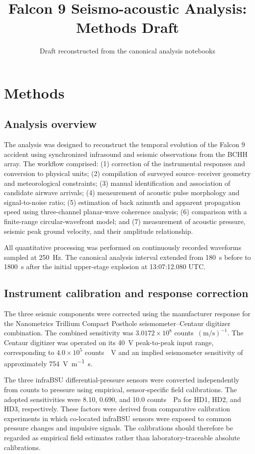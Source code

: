 \documentclass[12pt]{article}
\title{Falcon 9 Seismo-acoustic Analysis: Methods Draft}
\author{}
\date{Draft reconstructed from the canonical analysis notebooks}
\begin{document}
\maketitle

\section{Methods}

\subsection{Analysis overview}

The analysis was designed to reconstruct the temporal evolution of the Falcon 9
accident using synchronized infrasound and seismic observations from the BCHH
array. The workflow comprised: (1) correction of the instrumental responses and
conversion to physical units; (2) compilation of surveyed source--receiver
geometry and meteorological constraints; (3) manual identification and
association of candidate airwave arrivals; (4) measurement of acoustic pulse
morphology and signal-to-noise ratio; (5) estimation of back azimuth and apparent
propagation speed using three-channel planar-wave coherence analysis; (6)
comparison with a finite-range circular-wavefront model; and (7) measurement of
acoustic pressure, seismic peak ground velocity, and their amplitude
relationship.

All quantitative processing was performed on continuously recorded waveforms
sampled at \SI{250}{\hertz}. The canonical analysis interval extended from
\SI{180}{\second} before to \SI{1800}{\second} after the initial upper-stage
explosion at 13:07:12.080 UTC.

\subsection{Instrument calibration and response correction}

The three seismic components were corrected using the manufacturer response for
the Nanometrics Trillium Compact Posthole seismometer--Centaur digitizer
combination. The combined sensitivity was
$3.0172\times10^{8}$ counts~$(\si{\metre\per\second})^{-1}$. The Centaur
digitizer was operated on its \SI{40}{\volt} peak-to-peak input range,
corresponding to $4.0\times10^{5}$ counts~\si{\per\volt} and an implied
seismometer sensitivity of approximately
\SI{754}{\volt\per\metre\second}.

The three infraBSU differential-pressure sensors were converted independently
from counts to pressure using empirical, sensor-specific field calibrations. The
adopted sensitivities were 8.10, 0.690, and 10.0 counts~\si{\per\pascal} for HD1,
HD2, and HD3, respectively. These factors were derived from comparative
calibration experiments in which co-located infraBSU sensors were exposed to
common pressure changes and impulsive signals. The calibrations should therefore
be regarded as empirical field estimates rather than laboratory-traceable
absolute calibrations.
\end{document}
